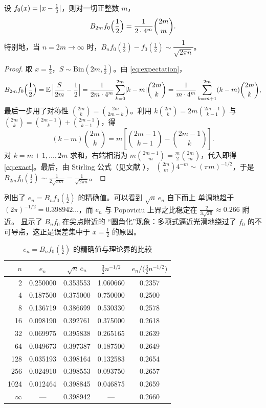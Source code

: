 \documentclass{mojing-paper}
\begin{document}
\begin{theorem}\label{thm:sharp}
设 $f_0(x)=\lvert x-\frac12\rvert$，则对一切正整数 $m$，
\begin{equation}\label{eq:exact}
  B_{2m}f_0\Bigl(\frac12\Bigr)=\frac{1}{2\cdot4^m}\binom{2m}{m}.
\end{equation}
特别地，当 $n=2m\to\infty$ 时，$B_nf_0(\frac12)-f_0(\frac12)\sim\dfrac{1}{\sqrt{2\pi n}}$。
\end{theorem}

\begin{proof}
取 $x=\frac12$，$S\sim\mathrm{Bin}(2m,\frac12)$。由 \cref{eq:expectation}，
\[
  B_{2m}f_0\Bigl(\frac12\Bigr)=\mathbb{E}\,\Bigl\lvert\frac{S}{2m}-\frac12\Bigr\rvert
  =\frac{1}{2m\cdot4^m}\sum_{k=0}^{2m}\lvert k-m\rvert\binom{2m}{k}
  =\frac{1}{m\cdot4^m}\sum_{k=m+1}^{2m}(k-m)\binom{2m}{k},
\]
最后一步用了对称性 $\binom{2m}{k}=\binom{2m}{2m-k}$。利用
$k\binom{2m}{k}=2m\binom{2m-1}{k-1}$ 与 $\binom{2m}{k}=\binom{2m-1}{k}+\binom{2m-1}{k-1}$，得
\[
  (k-m)\binom{2m}{k}=m\left[\binom{2m-1}{k-1}-\binom{2m-1}{k}\right].
\]
对 $k=m+1,\dotsc,2m$ 求和，右端相消为 $m\binom{2m-1}{m}=\frac m2\binom{2m}{m}$，代入即得
\cref{eq:exact}。最后，由 Stirling 公式（见文献 \parencite{zhang1990,feller1968}），
$\binom{2m}{m}4^{-m}\sim(\pi m)^{-1/2}$，于是
$B_{2m}f_0(\frac12)\sim\frac{1}{2\sqrt{\pi m}}=\frac{1}{\sqrt{2\pi n}}$。
\end{proof}

 列出了 $e_n=B_nf_0(\frac12)$ 的精确值。可以看到 $\sqrt n\,e_n$ 自下而上
单调地趋于 $(2\pi)^{-1/2}=0.398942\dotso$，而 $e_n$ 与 Popoviciu 上界之比稳定在
$\frac{2}{3\sqrt{2\pi}}\approx0.266$ 附近。 显示了 $B_nf_0$ 在尖点附近的
“圆角化”现象：多项式逼近光滑地绕过了 $f_0$ 的不可导点，这正是误差集中于 $x=\frac12$ 的原因。

\begin{table}[htbp]
\centering
\caption{$e_n=B_nf_0(\frac12)$ 的精确值与理论界的比较}\label{tab:sharp}
\begin{tabular}{@{}r S[table-format=1.6] S[table-format=1.6] S[table-format=1.6] S[table-format=1.4]@{}}
\toprule
{$n$} & {$e_n$} & {$\sqrt{n}\,e_n$} & {$\frac32 n^{-1/2}$} & {$e_n\big/\bigl(\frac32n^{-1/2}\bigr)$} \\
    & 0.250000 & 0.353553 & 1.060660 & 0.2357 \\
4    & 0.187500 & 0.375000 & 0.750000 & 0.2500 \\
8    & 0.136719 & 0.386699 & 0.530330 & 0.2578 \\
16   & 0.098190 & 0.392761 & 0.375000 & 0.2618 \\
32   & 0.069975 & 0.395838 & 0.265165 & 0.2639 \\
64   & 0.049673 & 0.397387 & 0.187500 & 0.2649 \\
128  & 0.035193 & 0.398164 & 0.132583 & 0.2654 \\
256  & 0.024910 & 0.398553 & 0.093750 & 0.2657 \\
1024 & 0.012464 & 0.398845 & 0.046875 & 0.2659 \\
\midrule
{$\infty$} & {---} & 0.398942 & {---} & 0.2660 \\
\bottomrule
\end{tabular}
\end{table}
\end{document}
